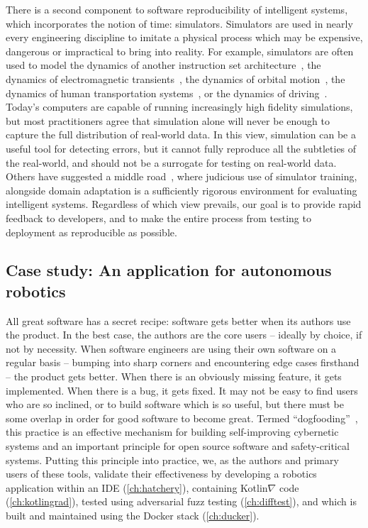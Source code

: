 \documentclass[12pt,initial,twoside,maitrise]{dms}
\numberwithin{equation}{section}
\numberwithin{table}{chapter}
\numberwithin{figure}{chapter}
\begin{document}
There is a second component to software reproducibility of intelligent systems, which incorporates the notion of time: simulators. Simulators are used in nearly every engineering discipline to imitate a physical process which may be expensive, dangerous or impractical to bring into reality. For example, simulators are often used to model the dynamics of another instruction set architecture~\citep{bellard2005qemu}, the dynamics of electromagnetic transients~\citep{tavante2018opensi}, the dynamics of orbital motion~\citep{bellman1965wengert}, the dynamics of human transportation systems~\citep{ruch2018amodeus}, or the dynamics of driving~\citep{gym_duckietown}. Today's computers are capable of running increasingly high fidelity simulations, but most practitioners agree that simulation alone will never be enough to capture the full distribution of real-world data. In this view, simulation can be a useful tool for detecting errors, but it cannot fully reproduce all the subtleties of the real-world, and should not be a surrogate for testing on real-world data. Others have suggested a middle road~\citep{bousmalis2018using}, where judicious use of simulator training, alongside domain adaptation is a sufficiently rigorous environment for evaluating intelligent systems. Regardless of which view prevails, our goal is to provide rapid feedback to developers, and to make the entire process from testing to deployment as reproducible as possible.

\subsection{Case study: An application for autonomous robotics}\label{subsec:case-study}

All great software has a secret recipe: software gets better when its authors use the product. In the best case, the authors are the core users -- ideally by choice, if not by necessity. When software engineers are using their own software on a regular basis -- bumping into sharp corners and encountering edge cases firsthand -- the product gets better. When there is an obviously missing feature, it gets implemented. When there is a bug, it gets fixed. It may not be easy to find users who are so inclined, or to build software which is so useful, but there must be some overlap in order for good software to become great. Termed ``dogfooding''~\citep{harrison2006eating}, this practice is an effective mechanism for building self-improving cybernetic systems and an important principle for open source software and safety-critical systems. Putting this principle into practice, we, as the authors and primary users of these tools, validate their effectiveness by developing a robotics application within an IDE (\autoref{ch:hatchery}), containing Kotlin$\nabla$ code (\autoref{ch:kotlingrad}), tested using adversarial fuzz testing (\autoref{ch:difftest}), and which is built and maintained using the Docker stack (\autoref{ch:ducker}).
\end{document}
